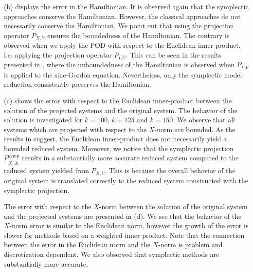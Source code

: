 (b) displays the error in the Hamiltonian. It is observed again that the symplectic approaches conserve the Hamiltonian. However, the classical approaches do not necessarily conserve the Hamiltonian. We point out that using the projection operator $P_{X,V}$ ensures the boundedness of the Hamiltonian. The contrary is observed when we apply the POD with respect to the Euclidean inner-product, i.e. applying the projection operator $P_{I,V}$. This can be seen in the results presented in \cite{doi:10.1137/140978922}, where the unboundedness of the Hamiltonian is observed when $P_{I,V}$ is applied to the sine-Gordon equation. Nevertheless, only the symplectic model reduction consistently preserves the Hamiltonian.

(c) shows the error with respect to the Euclidean inner-product between the solution of the projected systems and the original system. The behavior of the solution is investigated for $k=100$, $k=125$ and $k=150$. We observe that all systems which are projected with respect to the $X$-norm are bounded. As the results in \cite{doi:10.1137/140978922} suggest, the Euclidean inner-product does not necessarily yield a bounded reduced system. Moreover, we notice that the symplectic projection $P^{\text{symp}}_{X,\tilde A}$ results in a substantially more accurate reduced system compared to the reduced system yielded from $P_{X,V}$. This is because the overall behavior of the original system is translated correctly to the reduced system constructed with the symplectic projection.

The error with respect to the $X$-norm between the solution of the original system and the projected systems are presented in (d). We see that the behavior of the $X$-norm error is similar to the Euclidean norm, however the growth of the error is slower for methods based on a weighted inner product. Note that the connection between the error in the Euclidean norm and the $X$-norm is problem and discretization dependent. We also observed that symplectic methods are substantially more accurate.

